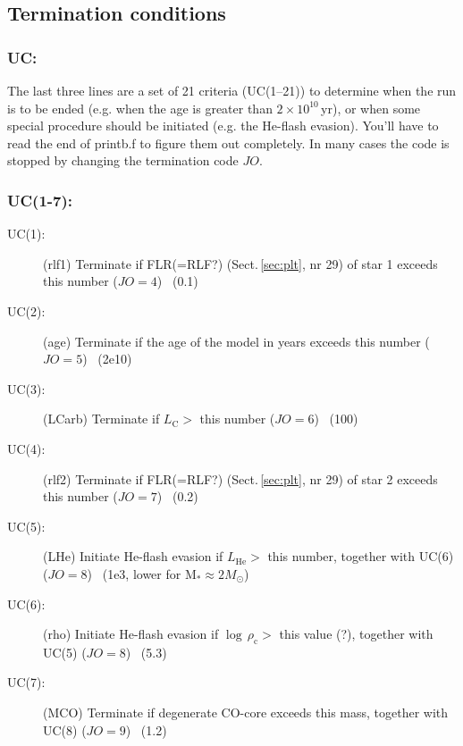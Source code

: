 \subsection{Termination conditions}
\subsubsection*{UC:}
The last three lines are a set of 21 criteria (UC(1--21)) to determine when the run is to
be ended (e.g. when the age is greater than $2\times 10^{10}\,$yr), or when some special procedure should be initiated (e.g. the He-flash evasion). You'll have to
read the end of printb.f to figure them out completely.  In many cases the code is stopped by changing the termination code $JO$.

\subsubsection*{UC(1-7):}
\begin{description}
\item[UC(1):] (rlf1)  Terminate if FLR(=RLF?) (Sect.\,\ref{sec:plt}, nr 29) of star 1 exceeds this number ($JO=4$)  ~(0.1)
\item[UC(2):] (age)   Terminate if the age of the model in years exceeds this number ($JO=5$) ~(2e10)
\item[UC(3):] (LCarb) Terminate if $L_\mathrm{C} > $ this number ($JO=6$)  ~(100)
\item[UC(4):] (rlf2)  Terminate if FLR(=RLF?) (Sect.\,\ref{sec:plt}, nr 29) of star 2 exceeds this number ($JO=7$)  ~(0.2)
\item[UC(5):] (LHe)   Initiate He-flash evasion if $L_\mathrm{He} > $ this number, together with UC(6) ($JO=8$)  ~(1e3, lower for M$_*\approx 2M_\odot$)
\item[UC(6):] (rho)   Initiate He-flash evasion if $\log\,\rho_\mathrm{c} >$ this value (?), together with UC(5) ($JO=8$)  ~(5.3)
\item[UC(7):] (MCO)   Terminate if degenerate CO-core exceeds this mass, together with UC(8) ($JO=9$)  ~(1.2)
\end{description}

